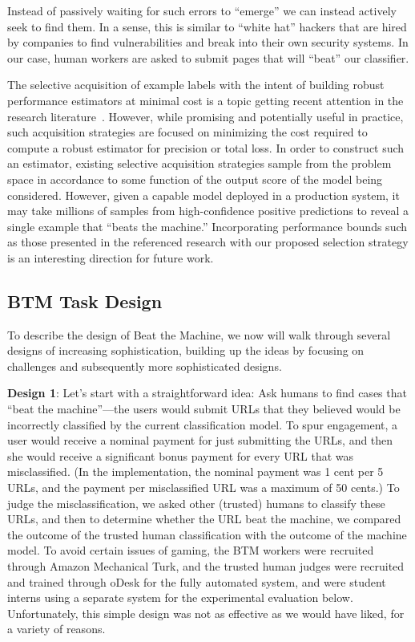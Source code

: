 {Instead of passively waiting for such errors to ``emerge'' we can instead actively seek to find them. In a sense, this is similar to ``white hat'' hackers that are hired by companies to find vulnerabilities and break into their own security systems. In our case, human workers are asked to submit pages that will ``beat'' our classifier.

The selective acquisition of example labels with the intent of building robust performance estimators at minimal cost is a topic getting recent attention in the research literature~\cite{activerisk2010,bennett:online}. However, while promising and potentially useful in practice, such acquisition strategies are focused on minimizing the cost required to compute a robust estimator for precision or total loss. In order to construct such an estimator, existing selective acquisition strategies sample from the problem space in accordance to some function of the output score of the model being considered. However, given a capable model deployed in a production system, it may take millions of samples from high-confidence positive predictions to reveal a single example that ``beats the machine.'' Incorporating performance bounds such as those presented in the referenced research with our proposed selection strategy is an interesting direction for future work. 
}

\subsection{BTM Task Design}

To describe the design of Beat the Machine, we now will walk through several designs of increasing sophistication, building up the ideas by focusing on challenges and subsequently more sophisticated designs.

\textbf{Design 1}: Let's start with a straightforward idea: Ask humans to find cases that ``beat the machine''---the users would submit URLs that they believed would be incorrectly classified by the current classification model.  To spur engagement, a user would receive a nominal payment for just submitting the URLs, and then she would receive a significant bonus payment for every URL that was misclassified. (In the implementation, the nominal payment was 1 cent per 5 URLs, and the payment per misclassified URL was a maximum of 50 cents.)  To judge the misclassification, we asked other (trusted) humans to classify these URLs, and then to determine whether the URL beat the machine, we compared the outcome of the trusted human classification with the outcome of the machine model. To avoid certain issues of gaming, the BTM workers were recruited through Amazon Mechanical Turk, and the trusted human judges were recruited and trained through oDesk for the fully automated system, and were student interns using a separate system for the experimental evaluation below.  Unfortunately, this simple design was not as effective as we would have liked, for a variety of reasons.

